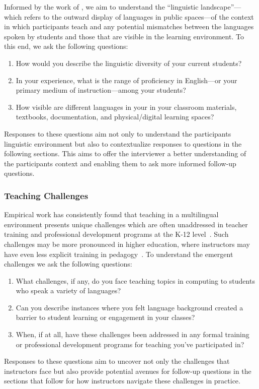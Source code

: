 {Informed by the work of \citet{gorter2021linguistic}, we aim to understand the
``linguistic landscape''---which refers to the outward display of languages in
public spaces---of the context in which participants teach and any potential
mismatches between the languages spoken by students and those that are visible
in the learning environment. To this end, we ask the following questions:
\begin{enumerate}[label={LL.\arabic*}, align=left, leftmargin=4em]
  \item How would you describe the linguistic diversity of your current students? 
  \item In your experience, what is the range of proficiency in English---or your primary medium of instruction---among your students? 
  \item How visible are different languages in your in your classroom materials, textbooks, documentation, and physical/digital learning spaces?
\end{enumerate}
Responses to these questions aim not only to understand the participants
linguistic environment but also to contextualize responses to questions in the
following sections. This aims to offer the interviewer a better understanding
of the participants context and enabling them to ask more informed follow-up
questions.


\subsubsection{Teaching Challenges}\label{subsubsec:teaching-challenges}

Empirical work has consistently found that teaching in a multilingual environment
presents unique challenges which are often unaddressed in teacher training and
professional development programs at the K-12 level~\cite{}. Such challenges may
be more pronounced in higher education, where instructors may have even less
explicit training in pedagogy~\cite{}. To understand the emergent challenges we
ask the following questions:
\begin{enumerate}[label={TC.\arabic*}, align=left, leftmargin=4em]
  \item What challenges, if any, do you face teaching topics in computing to
    students who speak a variety of languages?
  \item Can you describe instances where you felt language background created a
    barrier to student learning or engagement in your classes?
  \item When, if at all, have these challenges been addressed in any formal
    training or professional development programs for teaching you've
    participated in?
\end{enumerate}
Responses to these questions aim to uncover not only the challenges that instructors 
face but also provide potential avenues for follow-up questions in the sections
that follow for how instructors navigate these challenges in practice.


}
